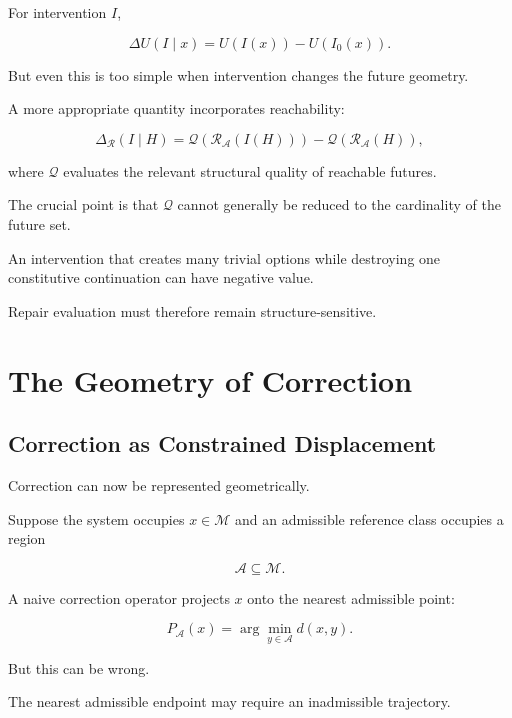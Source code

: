 \documentclass[11pt]{article}
\theoremstyle{remark}
\newcommand{\Adm}{\mathcal{A}}
\newcommand{\Reach}{\mathcal{R}}
\begin{document}
For intervention $I$,

\begin{equation}
\Delta U(I\mid x)
=
U(I(x))-U(I_0(x)).
\end{equation}

But even this is too simple when intervention changes the future geometry.

A more appropriate quantity incorporates reachability:

\begin{equation}
\Delta_{\Reach}(I\mid H)
=
\mathcal{Q}
\left(
\Reach_{\Adm}(I(H))
\right)
-
\mathcal{Q}
\left(
\Reach_{\Adm}(H)
\right),
\end{equation}

where $\mathcal{Q}$ evaluates the relevant structural quality of reachable futures.

The crucial point is that $\mathcal{Q}$ cannot generally be reduced to the cardinality of the future set.

An intervention that creates many trivial options while destroying one constitutive continuation can have negative value.

Repair evaluation must therefore remain structure-sensitive.

\section{The Geometry of Correction}

\subsection{Correction as Constrained Displacement}

Correction can now be represented geometrically.

Suppose the system occupies $x\in\mathcal{M}$ and an admissible reference class occupies a region

\begin{equation}
\mathcal{A}\subseteq\mathcal{M}.
\end{equation}

A naive correction operator projects $x$ onto the nearest admissible point:

\begin{equation}
P_{\mathcal{A}}(x)
=
\arg\min_{y\in\mathcal{A}}
d(x,y).
\end{equation}

But this can be wrong.

The nearest admissible endpoint may require an inadmissible trajectory.
\end{document}
